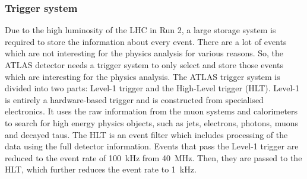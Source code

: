 \subsubsection{Trigger system}%
\label{sec:lhcandatlas:atlas:trigger}
Due to the high luminosity of the LHC in Run 2, a large storage system is required to store the information about every event. There are a lot of events which are not interesting for the physics analysis for various reasons. So, the ATLAS detector needs a trigger system to only select and store those events which are interesting for the physics analysis. The ATLAS trigger system is divided into two parts: Level-1 trigger and the High-Level trigger (HLT). Level-1 is entirely a hardware-based trigger and is constructed from specialised electronics. It uses the raw information from the muon systems and calorimeters to search for high energy physics objects, such as jets, electrons, photons, muons and decayed taus. The HLT is an event filter which includes processing of the data using the full detector information. Events that pass the Level-1 trigger are reduced to the event rate of \SI{100}{\kilo\hertz} from \SI{40}{\mega\hertz}. Then, they are passed to the HLT, which further reduces the event rate to \SI{1}{\kilo\hertz}.~\cite{atlas}


